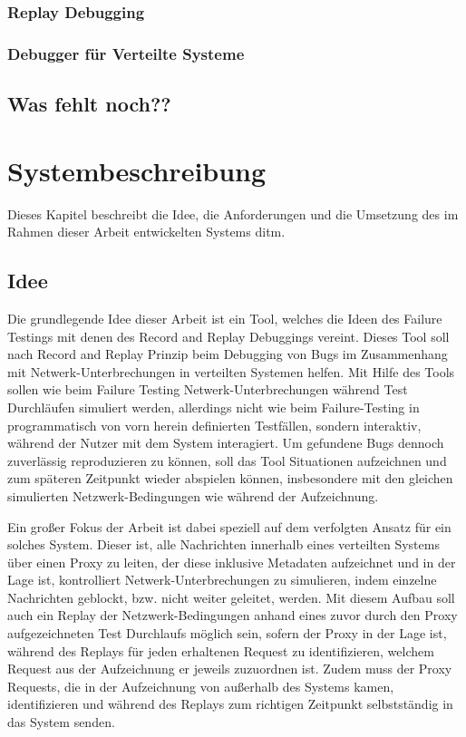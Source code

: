 \documentclass[12pt,a4paper]{report}
\begin{document}
\subsection{Replay Debugging}
\cite{distributed_replay_debugging_1997}
\subsection{Debugger für Verteilte Systeme}
\cite{oddity_graphical_debugger}
\cite{gotcha_interactive_debugger}

\section{Was fehlt noch??}

\chapter{Systembeschreibung}
Dieses Kapitel beschreibt die Idee, die Anforderungen und die Umsetzung des im Rahmen dieser Arbeit entwickelten Systems ditm.
\section{Idee}
Die grundlegende Idee dieser Arbeit ist ein Tool, welches die Ideen des Failure Testings mit denen des Record and Replay
Debuggings vereint. Dieses Tool soll nach Record and Replay Prinzip beim Debugging von Bugs im Zusammenhang mit
Netwerk-Unterbrechungen in verteilten Systemen helfen. Mit Hilfe des Tools sollen wie beim Failure Testing Netwerk-Unterbrechungen
während Test Durchläufen simuliert werden, allerdings nicht wie beim Failure-Testing in programmatisch von vorn herein definierten
Testfällen, sondern interaktiv, während der Nutzer mit dem System interagiert. Um gefundene Bugs dennoch zuverlässig reproduzieren
zu können, soll das Tool Situationen aufzeichnen und zum späteren Zeitpunkt wieder abspielen können, insbesondere mit den gleichen
simulierten Netzwerk-Bedingungen wie während der Aufzeichnung.

Ein großer Fokus der Arbeit ist dabei speziell auf dem verfolgten Ansatz für ein solches System. Dieser ist, alle Nachrichten
innerhalb eines verteilten Systems über einen Proxy zu leiten, der diese inklusive Metadaten aufzeichnet und in der Lage ist,
kontrolliert Netwerk-Unterbrechungen zu simulieren, indem einzelne Nachrichten geblockt, bzw. nicht weiter geleitet, werden.  Mit
diesem Aufbau soll auch ein Replay der Netzwerk-Bedingungen anhand eines zuvor durch den Proxy aufgezeichneten Test Durchlaufs
möglich sein, sofern der Proxy in der Lage ist, während des Replays für jeden erhaltenen Request zu identifizieren, welchem
Request aus der Aufzeichnung er jeweils zuzuordnen ist. Zudem muss der Proxy Requests, die in der Aufzeichnung von außerhalb des
Systems kamen, identifizieren und während des Replays zum richtigen Zeitpunkt selbstständig in das System senden.
\end{document}
